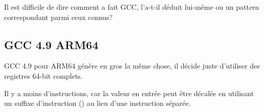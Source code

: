 Il est difficile de dire comment a fait GCC, l'a-t-il déduit lui-même ou un pattern
correspondant parmi ceux connus?

\subsection{GCC 4.9 ARM64 \Optimizing}

GCC 4.9 pour ARM64 génère en gros la même chose, il décide juste d'utiliser des registres
64-bit complets.

Il y a moins d'instructions, car la valeur en entrée peut être décalée en utilisant
un suffixe d'instruction () au lieu d'une instruction séparée.


